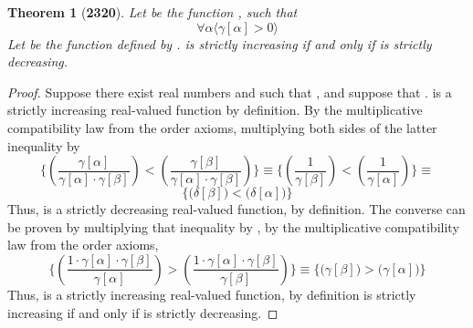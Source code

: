 \documentclass[preview]{standalone}
\newtheorem*{theorem*}{Theorem}
\begin{document}
\begin{theorem*}[\textbf{2320}]
    Let \bm{$\gamma$} be the function ,
    such that
    \begin{equation*}
        \forall \alpha
            \Big \langle \gamma [ \alpha ] > 0 \Big \rangle
    \end{equation*}
    Let \bm{$\delta$} be the function  
    defined by 
    . 
    \bm{$\gamma[\alpha]$} is strictly increasing 
    if and only if 
    \bm{$\delta[\alpha]$} is strictly decreasing.
\end{theorem*}

\begin{proof}
    Suppose there exist real numbers \bm{$\alpha$} and \bm{$\beta$} such that 
    \bm{$\alpha < \beta$}, 
    and suppose that \bm{$\gamma[\alpha] < \gamma[\beta]$}. 
    \bm{$\gamma$} is a strictly increasing real-valued function by definition.
    By the multiplicative compatibility law from the order axioms, 
    multiplying both sides of the latter inequality by 
    \begin{equation*}
        \Bigg\{
            \left(
                \frac{\gamma[\alpha]}{\gamma[\alpha] \cdot \gamma[\beta]} 
            \right)
                    < 
            \left(
                \frac{\gamma[\beta]}{\gamma[\alpha] \cdot \gamma[\beta]}
            \right)
        \Bigg\}
            \equiv
        \Bigg\{
            \left(
                \frac{1}{\gamma[\beta]}
            \right)
                <
            \left(
                \frac{1}{\gamma[\alpha]}
            \right)
        \Bigg\}
            \equiv
    \end{equation*}
    \begin{equation*}
        \Bigg\{
            \bigg( \delta[\beta] \bigg)
                < 
            \bigg( \delta[\alpha] \bigg)
        \Bigg\}
    \end{equation*}
    Thus, \bm{$\delta$} is a strictly decreasing real-valued function,
    by definition. The converse can be proven by multiplying that inequality
    \bm{$\delta[\alpha] > \delta[\beta]$} by \bm{$\gamma[\alpha]\gamma[\beta]$},
    by the multiplicative compatibility law from the order axioms,
    \begin{equation*}
        \Bigg\{
            \left(
                \frac{1 \cdot \gamma[\alpha] \cdot \gamma[\beta]}{\gamma[\alpha]}
            \right)
                >
            \left(
                \frac{1 \cdot \gamma[\alpha] \cdot \gamma[\beta]}{\gamma[\beta]}
            \right)
        \Bigg\}
            \equiv
        \Bigg\{
            \bigg( \gamma[\beta] \bigg) 
                > 
            \bigg( \gamma[\alpha] \bigg)
        \Bigg\}
    \end{equation*}
    Thus, \bm{$\gamma$} is a strictly increasing real-valued function, by definition
    \bm{$\therefore \text{\space} \gamma[\alpha]$} is strictly increasing 
    if and only if 
    \bm{$\delta[\alpha]$} is strictly decreasing.
\color{lightgray} \end{proof}
\end{document}
